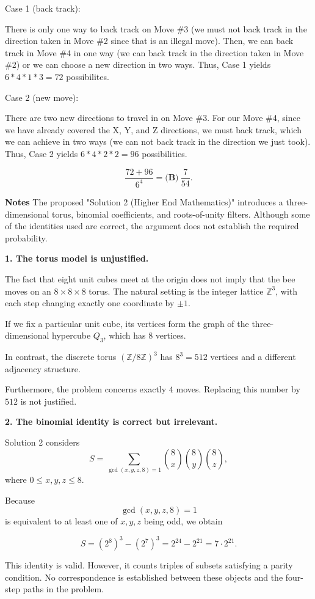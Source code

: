 \begin{enumerate}
 Case 1 (back track):

 There is only one way to back track on Move \#3 (we must not back track in the direction taken in Move \#2 since that is an illegal move). Then, we can back track in Move \#4 in one way (we can back track in the direction taken in Move \#2) or we can choose a new direction in two ways. Thus, Case 1 yields $6 * 4 * 1 * 3 = 72$ possibilites.

 Case 2 (new move):

 There are two new directions to travel in on Move \#3. For our Move \#4, since we have already covered the X, Y, and Z directions, we must back track, which we can achieve in two ways (we can not back track in the direction we just took). Thus, Case 2 yields $6 * 4 * 2 * 2 = 96$ possibilities.

 
 \[\frac{72 + 96}{6^4} = \boxed{\textbf{(B)}\ \frac7{54}}.\]

 \textbf{Notes} The proposed "Solution 2 (Higher End Mathematics)" introduces a three-dimensional torus, binomial coefficients, and roots-of-unity filters. Although some of the identities used are correct, the argument does not establish the required probability.

 \textbf{1. The torus model is unjustified.}

 The fact that eight unit cubes meet at the origin does not imply that the bee moves on an $8\times8\times8$ torus. The natural setting is the integer lattice $\mathbb Z^3$, with each step changing exactly one coordinate by $\pm1$.

 If we fix a particular unit cube, its vertices form the graph of the three-dimensional hypercube $Q_3$, which has $8$ vertices.

 In contrast, the discrete torus $(\mathbb Z/8\mathbb Z)^3$ has $8^3=512$ vertices and a different adjacency structure.

 Furthermore, the problem concerns exactly $4$ moves. Replacing this number by $512$ is not justified.

 \textbf{2. The binomial identity is correct but irrelevant.}

 Solution 2 considers
 \[S=\sum_{\gcd(x,y,z,8)=1}\binom8x\binom8y\binom8z,\]where $0\le x,y,z\le8$.

 Because
 \[\gcd(x,y,z,8)=1\]is equivalent to at least one of $x,y,z$ being odd, we obtain

 
 \[S=(2^8)^3-(2^7)^3=2^{24}-2^{21}=7\cdot2^{21}.\]

 
This identity is valid. However, it counts triples of subsets satisfying a parity condition. No correspondence is established between these objects and the four-step paths in the problem.


\end{enumerate}

